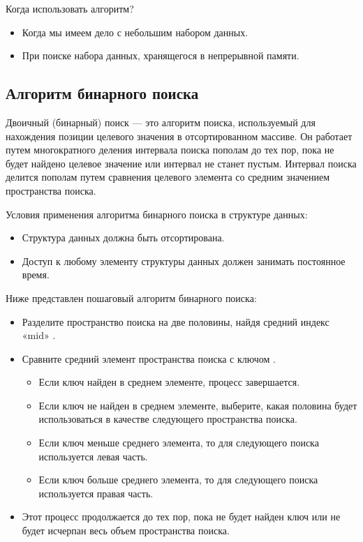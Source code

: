 Когда использовать алгоритм?
\begin{itemize}
\item Когда мы имеем дело с небольшим набором данных.
\item При поиске набора данных, хранящегося в непрерывной памяти. \cite{geeks_linear}
\end{itemize}

\subsection{Алгоритм бинарного поиска}

\hspace{1.25cm}
Двоичный (бинарный) поиск — это алгоритм поиска, используемый для нахождения позиции целевого значения в отсортированном массиве. Он работает путем многократного деления интервала поиска пополам до тех пор, пока не будет найдено целевое значение или интервал не станет пустым. Интервал поиска делится пополам путем сравнения целевого элемента со средним значением пространства поиска.

\vspace{0.25cm}
Условия применения алгоритма бинарного поиска в структуре данных:
\begin{itemize}
\item Структура данных должна быть отсортирована.
\item Доступ к любому элементу структуры данных должен занимать постоянное время.
\end{itemize}

Ниже представлен пошаговый алгоритм бинарного поиска:

\begin{itemize}
\item Разделите пространство поиска на две половины, найдя средний индекс «mid» . 
\item Сравните средний элемент пространства поиска с ключом .
\begin{itemize}
\item Если ключ найден в среднем элементе, процесс завершается.
\item Если ключ не найден в среднем элементе, выберите, какая половина будет использоваться в качестве следующего пространства поиска.
\item Если ключ меньше среднего элемента, то для следующего поиска используется левая часть.
\item Если ключ больше среднего элемента, то для следующего поиска используется правая часть.
\end{itemize}
\item Этот процесс продолжается до тех пор, пока не будет найден ключ или не будет исчерпан весь объем пространства поиска.
\end{itemize}

